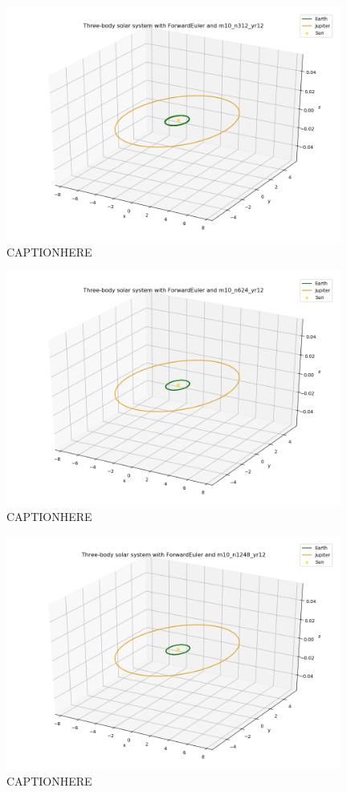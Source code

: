 \documentclass{article}
\begin{document}
    \begin{figure}[H]
        \centering
        \includegraphics[width = 11cm]{img/plot3D_S_E_J_F_m10_n312_yr12.png}
        \caption{CAPTIONHERE}
        \label{fig:plot3D_S_E_J_F_m10_n312_yr12}
    \end{figure}

    \begin{figure}[H]
        \centering
        \includegraphics[width = 11cm]{img/plot3D_S_E_J_F_m10_n624_yr12.png}
        \caption{CAPTIONHERE}
        \label{fig:plot3D_S_E_J_F_m10_n624_yr12}
    \end{figure}

    \begin{figure}[H]
        \centering
        \includegraphics[width = 11cm]{img/plot3D_S_E_J_F_m10_n1248_yr12.png}
        \caption{CAPTIONHERE}
        \label{fig:plot3D_S_E_J_F_m10_n1248_yr12}
    \end{figure}
\end{document}
